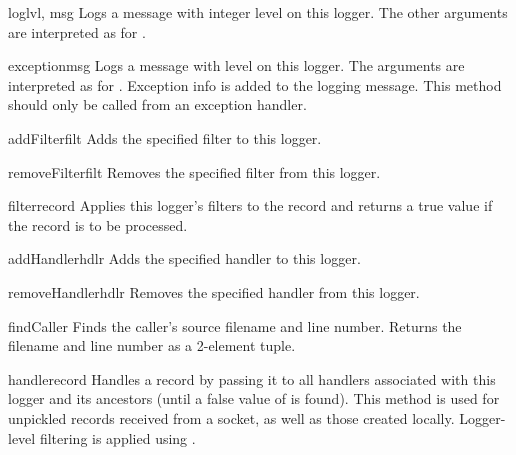 \begin{methoddesc}{log}{lvl, msg}
Logs a message with integer level  on this logger.
The other arguments are interpreted as for .
\end{methoddesc}

\begin{methoddesc}{exception}{msg}
Logs a message with level  on this logger.
The arguments are interpreted as for . Exception info
is added to the logging message. This method should only be called
from an exception handler.
\end{methoddesc}

\begin{methoddesc}{addFilter}{filt}
Adds the specified filter  to this logger.
\end{methoddesc}

\begin{methoddesc}{removeFilter}{filt}
Removes the specified filter  from this logger.
\end{methoddesc}

\begin{methoddesc}{filter}{record}
Applies this logger's filters to the record and returns a true value if
the record is to be processed.
\end{methoddesc}

\begin{methoddesc}{addHandler}{hdlr}
Adds the specified handler  to this logger.
\end{methoddesc}

\begin{methoddesc}{removeHandler}{hdlr}
Removes the specified handler  from this logger.
\end{methoddesc}

\begin{methoddesc}{findCaller}{}
Finds the caller's source filename and line number. Returns the filename
and line number as a 2-element tuple.
\end{methoddesc}

\begin{methoddesc}{handle}{record}
Handles a record by passing it to all handlers associated with this logger
and its ancestors (until a false value of  is found).
This method is used for unpickled records received from a socket, as well
as those created locally. Logger-level filtering is applied using
.
\end{methoddesc}

